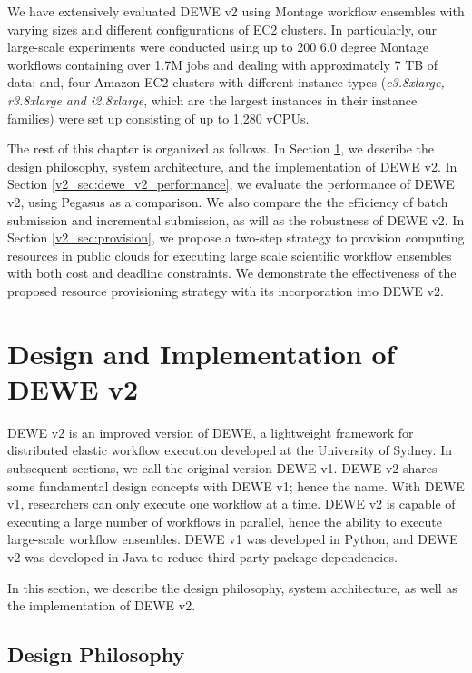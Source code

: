We have extensively evaluated DEWE v2 using Montage workflow ensembles with varying sizes and different configurations of EC2 clusters. In particularly, our large-scale experiments were conducted using up to 200 6.0 degree Montage workflows containing over 1.7M jobs and dealing with approximately 7 TB of data; and, four Amazon EC2 clusters with different instance types (\emph{c3.8xlarge, r3.8xlarge and i2.8xlarge}, which are the largest instances in their instance families) were set up consisting of up to 1,280 vCPUs. 

The rest of this chapter is organized as follows. In Section \ref{v2_sec:dewe_v2_design}, we describe the design philosophy, system architecture, and the implementation of DEWE v2. In Section \ref{v2_sec:dewe_v2_performance}, we evaluate the performance of DEWE v2, using Pegasus as a comparison. We also compare the the efficiency of batch submission and incremental submission, as will as the robustness of DEWE v2. In Section \ref{v2_sec:provision}, we propose a two-step strategy to provision computing resources in public clouds for executing large scale scientific workflow ensembles with both cost and deadline constraints. We demonstrate the effectiveness of the proposed resource provisioning strategy with its incorporation into DEWE v2. 


\section{Design and Implementation of DEWE v2}
\label{v2_sec:dewe_v2_design}

DEWE v2 is an improved version of DEWE, a lightweight framework for distributed elastic workflow execution developed at the University of Sydney. In subsequent sections, we call the original version DEWE v1.  DEWE v2 shares some fundamental design concepts with DEWE v1; hence the name. With DEWE v1, researchers can only execute one workflow at a time. DEWE v2 is capable of executing a large number of workflows in parallel, hence the ability to execute large-scale workflow ensembles. DEWE v1 was developed in Python, and DEWE v2 was developed in Java to reduce third-party package dependencies. 

In this section, we describe the design philosophy, system architecture, as well as the implementation of DEWE v2. 


\subsection{Design Philosophy}
\label{sec:subsec:design_philosophy}


